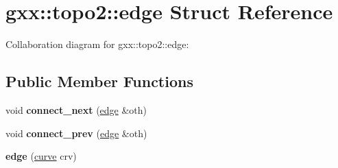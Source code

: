 \hypertarget{structgxx_1_1topo2_1_1edge}{}\section{gxx\+:\+:topo2\+:\+:edge Struct Reference}
\label{structgxx_1_1topo2_1_1edge}


Collaboration diagram for gxx\+:\+:topo2\+:\+:edge\+:
\subsection*{Public Member Functions}
\begin{DoxyCompactItemize}
\item 
void {\bfseries connect\+\_\+next} (\hyperlink{structgxx_1_1topo2_1_1edge}{edge} \&oth)\hypertarget{structgxx_1_1topo2_1_1edge_a27277668c79607a295c45f907d6d5545}{}\label{structgxx_1_1topo2_1_1edge_a27277668c79607a295c45f907d6d5545}

\item 
void {\bfseries connect\+\_\+prev} (\hyperlink{structgxx_1_1topo2_1_1edge}{edge} \&oth)\hypertarget{structgxx_1_1topo2_1_1edge_ab1c4c200e4d86ba73ee899492a6c9f17}{}\label{structgxx_1_1topo2_1_1edge_ab1c4c200e4d86ba73ee899492a6c9f17}

\item 
{\bfseries edge} (\hyperlink{classgxx_1_1topo2_1_1curve}{curve} crv)\hypertarget{structgxx_1_1topo2_1_1edge_a6e904cc482aa3bd3aebef7d1c31669e1}{}\label{structgxx_1_1topo2_1_1edge_a6e904cc482aa3bd3aebef7d1c31669e1}

\end{DoxyCompactItemize}
